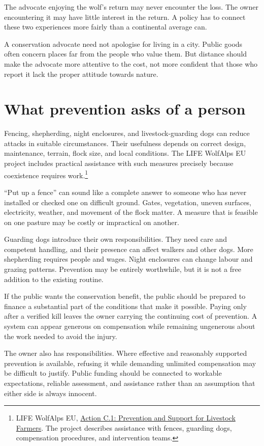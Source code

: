 \documentclass[12pt,a4paper]{book}
\begin{document}
The advocate enjoying the wolf's return may never encounter the loss. The owner encountering it may have little interest in the return. A policy has to connect these two experiences more fairly than a continental average can.

A conservation advocate need not apologise for living in a city. Public goods often concern places far from the people who value them. But distance should make the advocate more attentive to the cost, not more confident that those who report it lack the proper attitude towards nature.

\section*{What prevention asks of a person}

Fencing, shepherding, night enclosures, and livestock-guarding dogs can reduce attacks in suitable circumstances. Their usefulness depends on correct design, maintenance, terrain, flock size, and local conditions. The LIFE WolfAlps EU project includes practical assistance with such measures precisely because coexistence requires work.\footnote{LIFE WolfAlps EU, \href{https://www.lifewolfalps.eu/en/activities/c/c1/}{Action C.1: Prevention and Support for Livestock Farmers}. The project describes assistance with fences, guarding dogs, compensation procedures, and intervention teams.}

``Put up a fence'' can sound like a complete answer to someone who has never installed or checked one on difficult ground. Gates, vegetation, uneven surfaces, electricity, weather, and movement of the flock matter. A measure that is feasible on one pasture may be costly or impractical on another.

Guarding dogs introduce their own responsibilities. They need care and competent handling, and their presence can affect walkers and other dogs. More shepherding requires people and wages. Night enclosures can change labour and grazing patterns. Prevention may be entirely worthwhile, but it is not a free addition to the existing routine.

If the public wants the conservation benefit, the public should be prepared to finance a substantial part of the conditions that make it possible. Paying only after a verified kill leaves the owner carrying the continuing cost of prevention. A system can appear generous on compensation while remaining ungenerous about the work needed to avoid the injury.

The owner also has responsibilities. Where effective and reasonably supported prevention is available, refusing it while demanding unlimited compensation may be difficult to justify. Public funding should be connected to workable expectations, reliable assessment, and assistance rather than an assumption that either side is always innocent.
\end{document}
